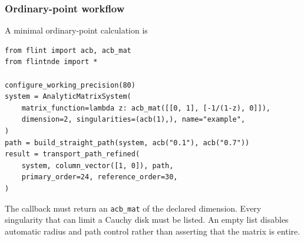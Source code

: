 \documentclass[11pt]{article}
\begin{document}
\subsubsection{Ordinary-point workflow}
\label{subsec:transport-api}

A minimal ordinary-point calculation is
\begin{verbatim}
from flint import acb, acb_mat
from flintnde import *

configure_working_precision(80)
system = AnalyticMatrixSystem(
    matrix_function=lambda z: acb_mat([[0, 1], [-1/(1-z), 0]]),
    dimension=2, singularities=(acb(1),), name="example",
)
path = build_straight_path(system, acb("0.1"), acb("0.7"))
result = transport_path_refined(
    system, column_vector([1, 0]), path,
    primary_order=24, reference_order=30,
)
\end{verbatim}
The callback must return an \texttt{acb\_mat} of the declared dimension.  Every singularity
that can limit a Cauchy disk must be listed.  An empty list disables automatic radius and
path control rather than asserting that the matrix is entire.
\end{document}
